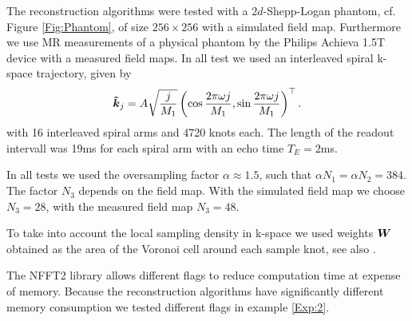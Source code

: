 \documentclass[journal]{IEEEtran}
\newcommand{\zb}[1]{\mbox{\boldmath{${#1}$}}}
\numberwithin{equation}{section}
\numberwithin{table}{section}
\numberwithin{figure}{section}
\begin{document}
The reconstruction algorithms were tested with a $2d$-Shepp-Logan phantom, cf. Figure \ref{Fig:Phantom}, of size $256\times256$ with a simulated field map. Furthermore we use MR measurements of a physical phantom by the Philips Achieva 1.5T device with a measured field maps. In all test we used an interleaved spiral k-space trajectory, given by
\begin{equation*}
\zb {\tilde k}_j = A \sqrt{\frac{j}{M_1}} \left(\cos\frac{2\pi \omega
    j}{M_1}, \sin\frac{2\pi \omega j}{M_1}\right)^{\top}. 
\end{equation*}
with 16 interleaved spiral arms and 4720 knots each.
The length of the readout intervall was 19ms for each spiral arm with an echo time $T_E=2$ms.

In all tests we used the oversampling factor $\alpha \approx 1.5$, such that $\alpha N_1=\alpha N_2 = 384$. The factor $N_3$ depends on the field map. With the simulated field map we choose $N_3=28$, with the measured field map $N_3=48$.


To take into account the local sampling density in k-space we used weights $\zb W$ obtained as the area of the Voronoi cell around each sample knot, see also \cite{KnKuPo,RaPrSiBoEg99,qhull}.

The NFFT2 library allows different flags to reduce computation time at expense of memory. Because the reconstruction algorithms have significantly different memory consumption  we tested different flags in example \ref{Exp:2}. 
\end{document}
